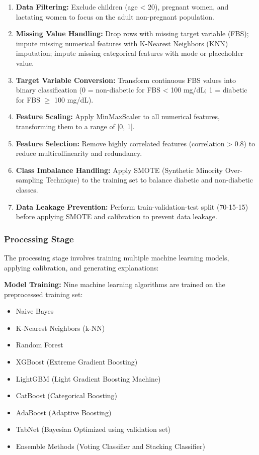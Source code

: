 \begin{enumerate}
    \item \textbf{Data Filtering:} Exclude children (age < 20), pregnant women, and lactating women to focus on the adult non-pregnant population.
    \item \textbf{Missing Value Handling:} Drop rows with missing target variable (FBS); impute missing numerical features with K-Nearest Neighbors (KNN) imputation; impute missing categorical features with mode or placeholder value.
    \item \textbf{Target Variable Conversion:} Transform continuous FBS values into binary classification (0 = non-diabetic for FBS < 100 mg/dL; 1 = diabetic for FBS $\geq$ 100 mg/dL).
    \item \textbf{Feature Scaling:} Apply MinMaxScaler to all numerical features, transforming them to a range of [0, 1].
    \item \textbf{Feature Selection:} Remove highly correlated features (correlation > 0.8) to reduce multicollinearity and redundancy.
    \item \textbf{Class Imbalance Handling:} Apply SMOTE (Synthetic Minority Over-sampling Technique) to the training set to balance diabetic and non-diabetic classes.
    \item \textbf{Data Leakage Prevention:} Perform train-validation-test split (70-15-15) before applying SMOTE and calibration to prevent data leakage.
\end{enumerate}

\subsubsection{Processing Stage}

The processing stage involves training multiple machine learning models, applying calibration, and generating explanations:

\textbf{Model Training:} Nine machine learning algorithms are trained on the preprocessed training set:
\begin{itemize}
    \item Naive Bayes
    \item K-Nearest Neighbors (k-NN)
    \item Random Forest
    \item XGBoost (Extreme Gradient Boosting)
    \item LightGBM (Light Gradient Boosting Machine)
    \item CatBoost (Categorical Boosting)
    \item AdaBoost (Adaptive Boosting)
    \item TabNet (Bayesian Optimized using validation set)
    \item Ensemble Methods (Voting Classifier and Stacking Classifier)
\end{itemize}

